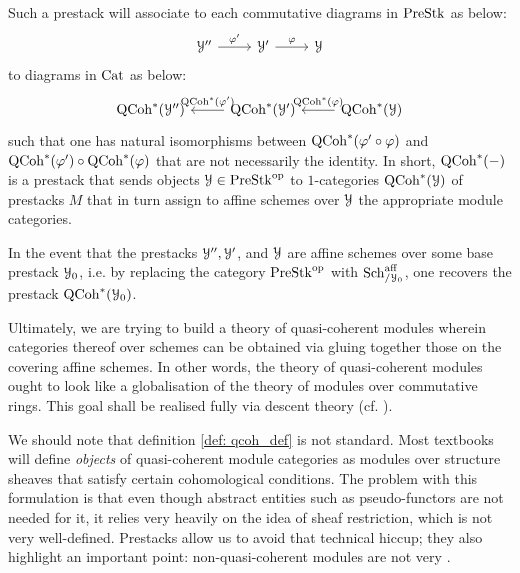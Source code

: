 \begin{definition}
\begin{enumerate}
                    Such a prestack will associate to each commutative diagrams in $\mathrm{Pre}\mathrm{Stk}$ as below:
                        $$
                            \begin{tikzcd}
                            	{\calY''} & {\calY'} & \calY
                            	\arrow["{\varphi'}", from=1-1, to=1-2]
                            	\arrow["\varphi", from=1-2, to=1-3]
                            \end{tikzcd}
                        $$
                    to diagrams in $\mathrm{Cat}$ as below:
                        $$
                            \begin{tikzcd}
                            	{\QCoh^*(\calY'')} & {\QCoh^*(\calY')} & {\QCoh^*(\calY)}
                            	\arrow["{\QCoh^*(\varphi')}"', from=1-2, to=1-1]
                            	\arrow["{\QCoh^*(\varphi)}"', from=1-3, to=1-2]
                            \end{tikzcd}
                        $$
                    such that one has natural isomorphisms between $\mathrm{QCoh}^*(\varphi' \circ \varphi)$ and $\mathrm{QCoh}^*(\varphi') \circ \mathrm{QCoh}^*(\varphi)$ that are not necessarily the identity. In short, $\mathrm{QCoh}^*(-)$ is a prestack that sends objects $\mathcal{Y} \in \mathrm{Pre}\mathrm{Stk}^{\mathrm{op}}$ to $1$-categories $\mathrm{QCoh}^*(\mathcal{Y})$ of prestacks $M$ that in turn assign to affine schemes over $\mathcal{Y}$ the appropriate module categories. 
                    
                    In the event that the prestacks $\mathcal{Y}'', \mathcal{Y}'$, and $\mathcal{Y}$ are affine schemes over some base prestack $\mathcal{Y}_0$, i.e. by replacing the category $\mathrm{Pre}\mathrm{Stk}^{\mathrm{op}}$ with $\mathrm{Sch}^{\mathrm{aff}}_{/\mathcal{Y}_0}$, one recovers the prestack $\mathrm{QCoh}^*(\mathcal{Y}_0)$. 
                \end{enumerate}
            \end{definition}
            \begin{remark}
                Ultimately, we are trying to build a theory of quasi-coherent modules wherein categories thereof over schemes can be obtained via gluing together those on the covering affine schemes. In other words, the theory of quasi-coherent modules ought to look like a globalisation of the theory of modules over commutative rings. This goal shall be realised fully via descent theory (cf. \cite{vistoli_descent}).
            \end{remark}
            \begin{remark}
                We should note that definition \ref{def: qcoh_def} is not standard. Most textbooks will define \textit{objects} of quasi-coherent module categories as modules over structure sheaves that satisfy certain cohomological conditions. The problem with this formulation is that even though abstract entities such as pseudo-functors are not needed for it, it relies very heavily on the idea of sheaf restriction, which is not very well-defined. Prestacks allow us to avoid that technical hiccup; they also highlight an important point: non-quasi-coherent modules are not very .
            \end{remark}
            
